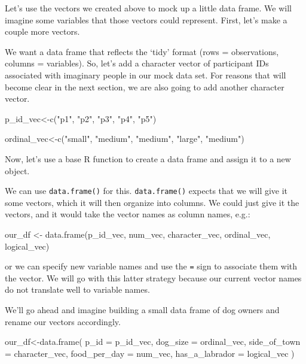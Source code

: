 \documentclass[
  letterpaper,
  DIV=11,
  numbers=noendperiod]{scrreprt}
\newenvironment{Shaded}{\begin{snugshade}}{\end{snugshade}}
\newcommand{\AttributeTok}[1]{\textcolor[rgb]{0.40,0.45,0.13}{#1}}
\newcommand{\FunctionTok}[1]{\textcolor[rgb]{0.28,0.35,0.67}{#1}}
\newcommand{\NormalTok}[1]{\textcolor[rgb]{0.00,0.23,0.31}{#1}}
\newcommand{\OtherTok}[1]{\textcolor[rgb]{0.00,0.23,0.31}{#1}}
\newcommand{\StringTok}[1]{\textcolor[rgb]{0.13,0.47,0.30}{#1}}
\begin{document}
Let's use the vectors we created above to mock up a little data frame.
We will imagine some variables that those vectors could represent.
First, let's make a couple more vectors.

We want a data frame that reflects the `tidy' format (rows =
observations, columns = variables). So, let's add a character vector of
participant IDs associated with imaginary people in our mock data set.
For reasons that will become clear in the next section, we are also
going to add another character vector.

\begin{Shaded}
\begin{Highlighting}[]
\NormalTok{p\_id\_vec}\OtherTok{\textless{}{-}}\FunctionTok{c}\NormalTok{(}\StringTok{"p1"}\NormalTok{, }\StringTok{"p2"}\NormalTok{, }\StringTok{"p3"}\NormalTok{, }\StringTok{"p4"}\NormalTok{, }\StringTok{"p5"}\NormalTok{)}

\NormalTok{ordinal\_vec}\OtherTok{\textless{}{-}}\FunctionTok{c}\NormalTok{(}\StringTok{"small"}\NormalTok{, }\StringTok{"medium"}\NormalTok{, }\StringTok{"medium"}\NormalTok{, }\StringTok{"large"}\NormalTok{, }\StringTok{"medium"}\NormalTok{)}
\end{Highlighting}
\end{Shaded}

Now, let's use a base R function to create a data frame and assign it to
a new object.

We can use \texttt{data.frame()} for this. \texttt{data.frame()} expects
that we will give it some vectors, which it will then organize into
columns. We could just give it the vectors, and it would take the vector
names as column names, e.g.:

\begin{Shaded}
\begin{Highlighting}[]
\NormalTok{our\_df }\OtherTok{\textless{}{-}} \FunctionTok{data.frame}\NormalTok{(p\_id\_vec, num\_vec, character\_vec, ordinal\_vec, logical\_vec)}
\end{Highlighting}
\end{Shaded}

or we can specify new variable names and use the \texttt{=} sign to
associate them with the vector. We will go with this latter strategy
because our current vector names do not translate well to variable
names.

We'll go ahead and imagine building a small data frame of dog owners and
rename our vectors accordingly.

\begin{Shaded}
\begin{Highlighting}[]
\NormalTok{our\_df}\OtherTok{\textless{}{-}}\FunctionTok{data.frame}\NormalTok{(}
  \AttributeTok{p\_id =}\NormalTok{ p\_id\_vec,}
  \AttributeTok{dog\_size =}\NormalTok{ ordinal\_vec,}
  \AttributeTok{side\_of\_town =}\NormalTok{ character\_vec,}
  \AttributeTok{food\_per\_day =}\NormalTok{ num\_vec, }
  \AttributeTok{has\_a\_labrador =}\NormalTok{ logical\_vec}
\NormalTok{)}
\end{Highlighting}
\end{Shaded}
\end{document}
